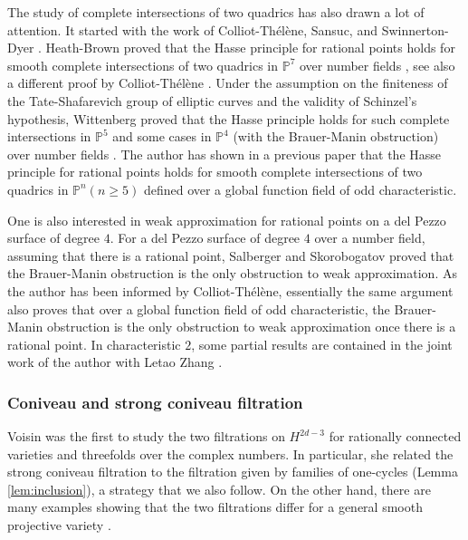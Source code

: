 \documentclass{amsart}
\theoremstyle{definition}
\theoremstyle{remark}
\newcommand{\mbb}{\mathbb}
\newcommand{\PP}{\mbb{P}}
\begin{document}
The study of complete intersections of two quadrics has also drawn a lot of attention. It started with the work of Colliot-Th\'el\`ene, Sansuc, and Swinnerton-Dyer \cite{CTSD}. Heath-Brown proved that the Hasse principle for rational points holds for smooth complete intersections of two quadrics in $\PP^7$ over number fields \cite{Heath-Brown_2_quadrics}, see also a different proof by Colliot-Th\'el\`ene \cite{CT2022CI22}. Under the assumption on the finiteness of the Tate-Shafarevich group of elliptic curves and the validity of Schinzel's hypothesis, Wittenberg proved that the Hasse principle holds for such complete intersections in $\PP^5$ and some cases in $\PP^4$ (with the Brauer-Manin obstruction) over number fields \cite{Wittenberg_Thesis}.
The author has shown in a previous paper \cite{Hasse} that the Hasse principle for rational points holds for smooth complete intersections of two quadrics in $\PP^n (n\geq 5)$ defined over a global function field of odd characteristic.

One is also interested in weak approximation for rational points on a del Pezzo surface of degree $4$.
For a del Pezzo surface of degree $4$ over a number field, assuming that there is a rational point, Salberger and Skorobogatov \cite{SS1991} proved that the Brauer-Manin obstruction is the only obstruction to weak approximation. 
As the author has been informed by Colliot-Th\'el\`ene, essentially the same argument also proves that over a global function field of odd characteristic, the Brauer-Manin obstruction is the only obstruction to weak approximation once there is a rational point. 
In characteristic $2$, some partial results are contained in the joint work of the author with Letao Zhang \cite{WACubicGlobal}.



\subsubsection{Coniveau and strong coniveau filtration} Voisin \cite{VoisinConiveau} was the first to study the two filtrations on $H^{2d-3}$ for rationally connected varieties and threefolds over the complex numbers. 
In particular, she related the strong coniveau filtration to the filtration given by families of one-cycles (Lemma \ref{lem:inclusion}), a strategy that we also follow. 
On the other hand, there are many examples showing that the two filtrations differ for a general smooth projective variety \cite{BO_Coniveau, ScaviaSuzuki_examples,Benoist2022Steenrod}.
\end{document}
